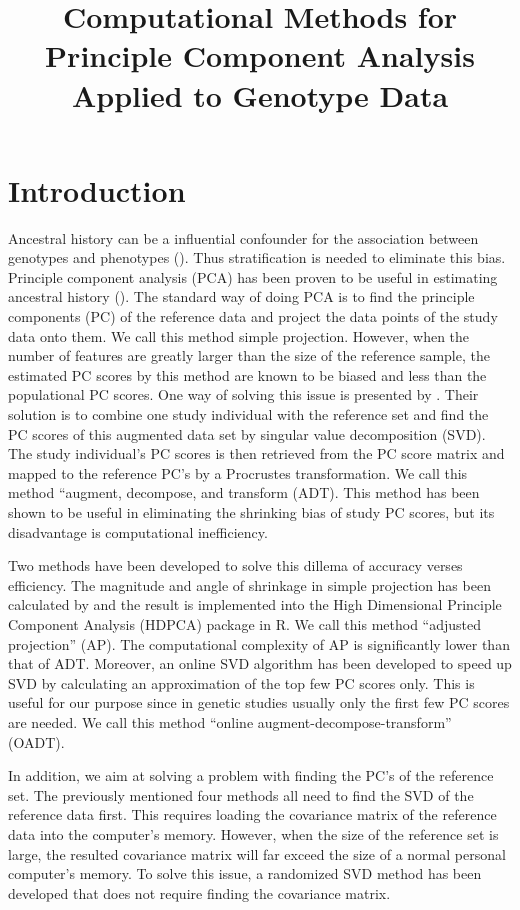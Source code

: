 \documentclass{article}
\title{Computational Methods for Principle Component Analysis Applied to
  Genotype Data}
\date{}
\author{}
\begin{document}
\maketitle

\section{Introduction}

Ancestral history can be a influential confounder for the association between
genotypes and phenotypes (\cite{price}).
Thus stratification is needed to eliminate this bias.
Principle component analysis (PCA) has been proven to be useful in estimating
ancestral history (\cite{reich}).
The standard way of doing PCA is to find the principle components (PC) of the
reference data and project the data points of the study data onto them.
We call this method simple projection.
However, when the number of features are greatly larger than the size of the
reference sample,
the estimated PC scores by this method are known to be biased and less
than the populational PC scores.
One way of solving this issue is presented by \cite{wang}.
Their solution is to combine one study individual with the reference set and
find the PC scores of this augmented data set by singular value decomposition (SVD).
The study individual's PC scores is then retrieved from the PC score matrix and
mapped to the reference PC's by a Procrustes transformation.
We call this method ``augment, decompose, and transform (ADT).
This method has been shown to be useful in eliminating the shrinking bias of
study PC scores, but its disadvantage is computational inefficiency.

Two methods have been developed to solve this dillema of accuracy verses efficiency.
The magnitude and angle of shrinkage in simple projection has been calculated by
\cite{dey} and the result is implemented into the High Dimensional Principle
Component Analysis (HDPCA) package in R.
We call this method ``adjusted projection'' (AP).
The computational complexity of AP is significantly lower than that of ADT.
Moreover, an online SVD algorithm has been developed to speed up SVD by calculating an approximation of the top few PC scores only.
This is useful for our purpose since in genetic studies usually only the first few PC scores are needed. 
We call this method ``online augment-decompose-transform'' (OADT). 

In addition, we aim at solving a problem with finding the PC's of the reference set.
The previously mentioned four methods all need to find the SVD of the reference data first.
This requires loading the covariance matrix of the reference data into the
computer's memory. 
However, when the size of the reference set is large,
the resulted covariance matrix will far exceed the size of a normal personal
computer's memory.
To solve this issue, a randomized SVD method has been developed that does not
require finding the covariance matrix.
\end{document}
